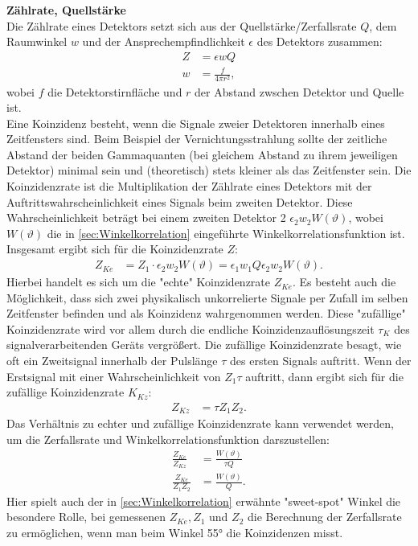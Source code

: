 \documentclass[%
aps,
onecolumn,
11pt,
tightenlines,
nofootinbib,
superscriptaddress,
floatfix,
prd,
]{revtex4-2}
\begin{document}
\vspace{15pt}
\noindent \textbf{Zählrate, Quellstärke}\\
Die Zählrate eines Detektors setzt sich aus der Quellstärke/Zerfallsrate $Q$, dem Raumwinkel $w$ und der Ansprechempfindlichkeit $\epsilon$ des Detektors zusammen:
\begin{align}
	Z &= \epsilon w Q \\
	w &= \frac{f}{4 \pi r^2} \nonumber,
\end{align}
wobei $f$ die Detektorstirnfläche und $r$ der Abstand zwschen Detektor und Quelle ist. \\
Eine Koinzidenz besteht, wenn die Signale zweier Detektoren innerhalb eines Zeitfensters sind. Beim Beispiel der Vernichtungsstrahlung sollte der zeitliche Abstand der beiden Gammaquanten (bei gleichem Abstand zu ihrem jeweiligen Detektor) minimal sein und (theoretisch) stets kleiner als das Zeitfenster sein. Die Koinzidenzrate ist die Multiplikation der Zählrate eines Detektors mit der Auftrittswahrscheinlichkeit eines Signals beim zweiten Detektor. Diese Wahrscheinlichkeit beträgt bei einem zweiten Detektor 2 $\epsilon_2w_2W(\vartheta)$, wobei $W(\vartheta)$ die in \ref{sec:Winkelkorrelation} eingeführte Winkelkorrelationsfunktion ist. Insgesamt ergibt sich für die Koinzidenzrate $Z$:
\begin{align}
	Z_{Ke} &= Z_1 \cdot \epsilon_2w_2W(\vartheta) = \epsilon_1 w_1 Q \epsilon_2 w_2 W(\vartheta).
\end{align}
Hierbei handelt es sich um die "echte" Koinzidenzrate $Z_{Ke}$. Es besteht auch die Möglichkeit, dass sich zwei physikalisch unkorrelierte Signale per Zufall im selben Zeitfenster befinden und als Koinzidenz wahrgenommen werden. Diese "zufällige" Koinzidenzrate wird vor allem durch die endliche Koinzidenzauflösungszeit $\tau_K$ des signalverarbeitenden Geräts vergrößert. Die zufällige Koinzidenzrate besagt, wie oft ein Zweitsignal innerhalb der Pulslänge $\tau$ des ersten Signals auftritt. Wenn der Erstsignal mit einer Wahrscheinlichkeit von $Z_1 \tau$ auftritt, dann ergibt sich für die zufällige Koinzidenzrate $K_{Kz}$:
\begin{align}
	Z_{Kz} &= \tau Z_1 Z_2.
\end{align}
Das Verhältnis zu echter und zufällige Koinzidenzrate kann verwendet werden, um die Zerfallsrate und Winkelkorrelationsfunktion darszustellen:
\begin{align}
	\frac{Z_{Ke}}{Z_{Kz}} &= \frac{W(\vartheta)}{\tau Q} \\
	\frac{Z_{Ke}}{Z_1Z_2} &= \frac{W(\vartheta)}{Q}.
\end{align}
Hier spielt auch der in \ref{sec:Winkelkorrelation} erwähnte "sweet-spot" Winkel die besondere Rolle, bei gemessenen $Z_{Ke}, Z_1$ und $Z_2$ die Berechnung der Zerfallsrate zu ermöglichen, wenn man beim Winkel 55° die Koinzidenzen misst.
\end{document}
